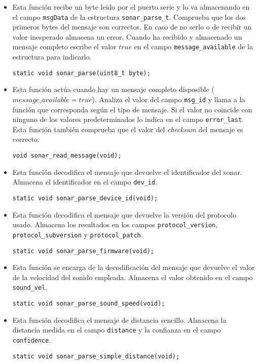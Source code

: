 	
\begin{itemize}
	\item Esta función recibe un byte leido por el puerto serie y lo va almacenando en el campo \texttt{msgData} de la estructura \texttt{sonar\_parse\_t}. Comprueba que los dos primeros bytes del mensaje son correctos. En caso de no serlo o de recibir un valor inesperado almacena un error. Cuando ha recibido y almacenado un mensaje completo escribe el valor $true$ en el campo \texttt{message\_available} de la estructura para indicarlo.
		\begin{lstlisting}[style=C]
	static void sonar_parse(uint8_t byte);
	\end{lstlisting}
	
	\item Esta función actúa cuando hay un mensaje completo disposible ($message\_available=true$). Analiza el valor del campo \texttt{msg\_id} y llama a la función que corresponda según el tipo de mensaje. Si el valor no coincide con ninguno de los valores predeterminados lo indica en el campo \texttt{error\_last}. Esta función también comprueba que el valor del \textit{checksum} del mensaje es correcto.
	\begin{lstlisting}[style=C]
	void sonar_read_message(void);
	\end{lstlisting}
	
	\item Esta función decodifica el mensaje que devuelve el identificador del sonar. Almacena el identificador en el campo \texttt{dev\_id}.
	\begin{lstlisting}[style=C]
	static void sonar_parse_device_id(void);
	\end{lstlisting}
	
	\item Esta función decodifica el mensaje que devuelve la versión del protocolo usado. Almacena los resultados en los campos \texttt{protocol\_version}, \texttt{protocol\_subversion} y \texttt{protocol\_patch}.
		\begin{lstlisting}[style=C]
	static void sonar_parse_firmware(void);
	\end{lstlisting}
	
	\item Esta función se encarga de la decodificación del mensaje que devuelve el valor de la velocidad del sonido empleada. Almacena el valor obtenido en el campo \texttt{sound\_vel}.
		\begin{lstlisting}[style=C]
	static void sonar_parse_sound_speed(void);
	\end{lstlisting}

	\item Esta función decodifica el mensaje de distancia sencillo. Almacena la distancia medida en el campo \texttt{distance} y la confianza en el campo \texttt{confidence}.
			\begin{lstlisting}[style=C]
	static void sonar_parse_simple_distance(void);
	\end{lstlisting}
	
\end{itemize}

